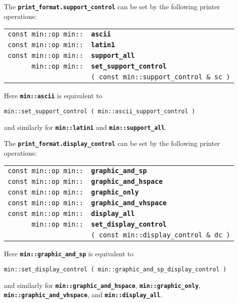\documentclass[12pt]{article}
\makeatletter
\newcommand{\TT}[1]{{\tt \bfseries #1}}
\newcommand{\ttindex}[1]{\index{#1@{\tt #1}}}
\newcommand{\EOL}{\penalty \exhyphenpenalty}
\newenvironment{indpar}[1][0.3in]%
	{\begin{list}{}%
		     {\setlength{\itemsep}{0in}%
		      \setlength{\topsep}{0in}%
		      \setlength{\parsep}{1ex}%
		      \setlength{\labelwidth}{#1}%
		      \setlength{\leftmargin}{#1}%
		      \addtolength{\leftmargin}{\labelsep}}%
	 \item}%
	{\end{list}}
\newcommand{\LABEL}[1]{\label{#1}}
\newlength{\ARGBREAKLENGTH}
\newcommand{\ARGBREAK}[1][\ARGBREAKLENGTH]{\\&\hspace*{#1}}
\newcommand{\MINKEY}[1]%
	   {\TT{#1}\ttindex{min::#1}\ttindex{#1}}
\makeatother
\begin{document}
The \TT{print\_format.support\_control} can be set by the following
printer operations:

\begin{indpar}[1em]\begin{tabular}{r@{}l}
\verb|const min::op min::| & \MINKEY{ascii}
\LABEL{MIN::ASCII} \\
\verb|const min::op min::| & \MINKEY{latin1}
\LABEL{MIN::LATIN1} \\
\verb|const min::op min::| & \MINKEY{support\_all}
\LABEL{MIN::SUPPORT_ALL} \\
\verb|min::op min::|
    & \MINKEY{set\_support\_control}\ARGBREAK
          \verb|( const min::support_control & sc )|
\LABEL{MIN::SET_SUPPORT_CONTROL} \\
\end{tabular}\end{indpar}

Here \TT{min::ascii} is equivalent to
\begin{center}
\verb|min::set_support_control ( min::ascii_support_control )|
\end{center}
and similarly for \TT{min::latin1} and \TT{min::support\_all}.

The \TT{print\_format.display\_control} can be set by the following
printer operations:

\begin{indpar}[1em]\begin{tabular}{r@{}l}
\verb|const min::op min::| & \MINKEY{graphic\_and\_sp}
\LABEL{MIN::GRAPHIC_AND_SP} \\
\verb|const min::op min::| & \MINKEY{graphic\_and\_hspace}
\LABEL{MIN::GRAPHIC_AND_HSPACE} \\
\verb|const min::op min::| & \MINKEY{graphic\_only}
\LABEL{MIN::GRAPHIC_ONLY} \\
\verb|const min::op min::| & \MINKEY{graphic\_and\_vhspace}
\LABEL{MIN::GRAPHIC_AND_VHSPACE} \\
\verb|const min::op min::| & \MINKEY{display\_all}
\LABEL{MIN::DISPLAY_ALL} \\
\verb|min::op min::|
    & \MINKEY{set\_display\_control}\ARGBREAK
          \verb|( const min::display_control & dc )|
\LABEL{MIN::SET_DISPLAY_CONTROL} \\
\end{tabular}\end{indpar}

Here \TT{min::graphic\_and\_sp} is equivalent to
\begin{center}
\verb|min::set_display_control ( min::graphic_and_sp_display_control )|
\end{center}
and similarly for \TT{min::\EOL graphic\_\EOL and\_\EOL hspace},
\TT{min::\EOL graphic\_\EOL only},
\TT{min::\EOL graphic\_\EOL and\_\EOL vhspace},
and \TT{min::\EOL display\_\EOL all}.
\end{document}
